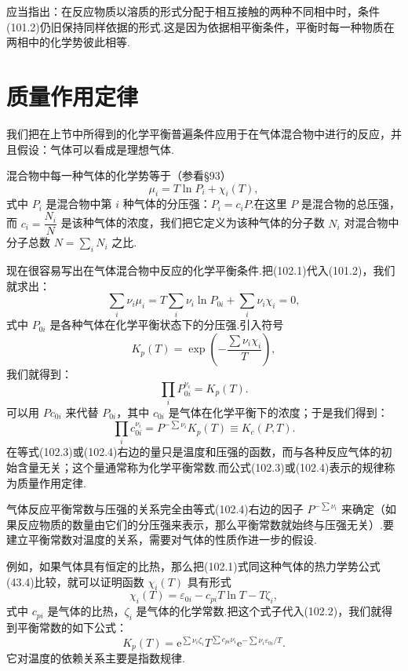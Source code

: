 应当指出：在反应物质以溶质的形式分配于相互接触的两种不同相中时，条件(101.2)仍旧保持同样依据的形式.这是因为依据相平衡条件，平衡时每一种物质在两相中的化学势彼此相等.

\section{质量作用定律}

我们把在上节中所得到的化学平衡普遍条件应用于在气体混合物中进行的反应，并且假设：气体可以看成是理想气体.

混合物中每一种气体的化学势等于（参看§93）
\begin{equation}
  \mu_i=T\ln P_i+\chi_i(T),
\end{equation}
式中 $P_i$ 是混合物中第 $i$ 种气体的分压强：$P_i=c_iP$.在这里 $P$ 是混合物的总压强，而 $c_i=\dfrac{N_i}{N}$ 是该种气体的浓度，我们把它定义为该种气体的分子数 $N_i$ 对混合物中分子总数 $N=\sum\limits_iN_i$ 之比.

现在很容易写出在气体混合物中反应的化学平衡条件.把(102.1)代入(101.2)，我们就求出：
\begin{equation*}
  \sum_i\nu_i\mu_i=T\sum_i\nu_i\ln P_{0i}+\sum_i\nu_i\chi_i=0,
\end{equation*}
式中 $P_{0i}$ 是各种气体在化学平衡状态下的分压强.引入符号
\begin{equation}
  K_p(T)=\exp\left(-\frac{\sum\nu_i\chi_i}{T}\right),
\end{equation}
我们就得到：
\begin{equation}
  \prod_iP_{0i}^{\nu_i}=K_p(T).
\end{equation}
可以用 $Pc_{0i}$ 来代替 $P_{0i}$，其中 $c_{0i}$ 是气体在化学平衡下的浓度；于是我们得到：
\begin{equation}
  \prod_ic_{0i}^{\nu_i}=P^{-\sum\nu_i}K_p(T)\equiv K_c(P,T).
\end{equation}
在等式(102.3)或(102.4)右边的量只是温度和压强的函数，而与各种反应气体的初始含量无关；这个量通常称为化学平衡常数.而公式(102.3)或(102.4)表示的规律称为质量作用定律.

气体反应平衡常数与压强的关系完全由等式(102.4)右边的因子 $P^{-\sum\nu_i}$ 来确定（如果反应物质的数量由它们的分压强来表示，那么平衡常数就始终与压强无关）.要建立平衡常数对温度的关系，需要对气体的性质作进一步的假设.

例如，如果气体具有恒定的比热，那么把(102.1)式同这种气体的热力学势公式(43.4)比较，就可以证明函数 $\chi_i(T)$ 具有形式
\begin{equation}
  \chi_i(T)=\varepsilon_{0i}-c_{pi}T\ln T-T\zeta_i,
\end{equation}
式中 $c_{pi}$ 是气体的比热，$\zeta_i$ 是气体的化学常数.把这个式子代入(102.2)，我们就得到平衡常数的如下公式：
\begin{equation}
  K_p(T)=\mathrm{e}^{\sum\nu_i\zeta_i}T^{\sum c_{pi}\nu_i}
  \mathrm{e}^{-\sum\nu_i\varepsilon_{0i}/T}.
\end{equation}
它对温度的依赖关系主要是指数规律.


